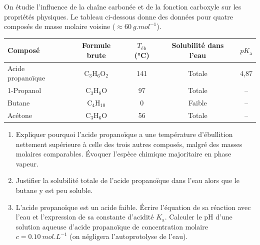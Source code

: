 \documentclass[11pt]{article}
\begin{document}
\begin{exercice}
On étudie l'influence de la chaîne carbonée et de la fonction carboxyle sur les propriétés physiques. Le tableau ci-dessous donne des données pour quatre composés de masse molaire voisine ($\approx \SI{60}{g.mol^{-1}}$).

\begin{tabular}{lcccc}
\toprule
Composé & Formule brute & $T_{\text{éb}}$ (\si{\celsius}) & Solubilité dans l'eau & $pK_{\text{a}}$ \\
\midrule
Acide propanoïque & C$_3$H$_6$O$_2$ & 141 & Totale & 4,87 \\
1-Propanol & C$_3$H$_8$O & 97 & Totale & -- \\
Butane & C$_4$H$_{10}$ & 0 & Faible & -- \\
Acétone & C$_3$H$_6$O & 56 & Totale & -- \\
\bottomrule
\end{tabular}

\begin{enumerate}
    \item Expliquer pourquoi l'acide propanoïque a une température d'ébullition nettement supérieure à celle des trois autres composés, malgré des masses molaires comparables. Évoquer l'espèce chimique majoritaire en phase vapeur.
    \item Justifier la solubilité totale de l'acide propanoïque dans l'eau alors que le butane y est peu soluble.
    \item L'acide propanoïque est un acide faible. Écrire l'équation de sa réaction avec l'eau et l'expression de sa constante d'acidité $K_{\text{a}}$. Calculer le pH d'une solution aqueuse d'acide propanoïque de concentration molaire $c = \SI{0,10}{mol.L^{-1}}$ (on négligera l'autoprotolyse de l'eau).
\end{enumerate}
\end{exercice}
\end{document}
